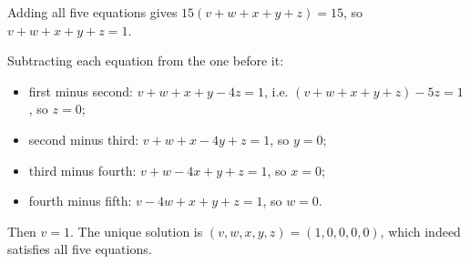 Adding all five equations gives $15(v+w+x+y+z)=15$, so $v+w+x+y+z=1$.

Subtracting each equation from the one before it:
\begin{itemize}
\item first minus second: $v+w+x+y-4z=1$, i.e. $(v+w+x+y+z)-5z=1$, so $z=0$;
\item second minus third: $v+w+x-4y+z=1$, so $y=0$;
\item third minus fourth: $v+w-4x+y+z=1$, so $x=0$;
\item fourth minus fifth: $v-4w+x+y+z=1$, so $w=0$.
\end{itemize}
Then $v=1$. The unique solution is $\boxed{(v,w,x,y,z)=(1,0,0,0,0)}$, which indeed satisfies all five equations.
